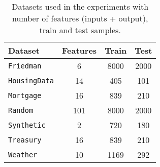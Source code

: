 \begin{table}[htbp]
  \centering
  \caption{Datasets used in the experiments with number of features (inputs + output), train and test samples.}
  \begin{tabular}{lccc}
    \toprule
    Dataset & Features & Train & Test \\
    \midrule
    \texttt{Friedman} & 6 & 8000 & 2000 \\
    \texttt{HousingData} & 14 & 405 & 101 \\
    \texttt{Mortgage} & 16 & 839 & 210 \\
    \texttt{Random} & 101 & 8000 & 2000 \\
    \texttt{Synthetic} & 2 & 720 & 180 \\
    \texttt{Treasury} & 16 & 839 & 210 \\
    \texttt{Weather} & 10 & 1169 & 292 \\
    \bottomrule
  \end{tabular}
  \label{tab:datasets}
\end{table}

